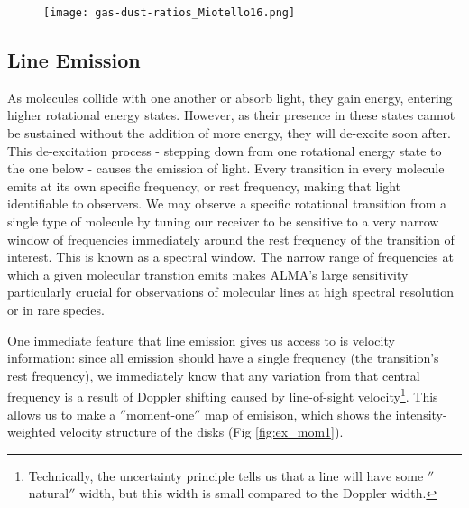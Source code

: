 \begin{figure}
\centering
  \texttt{[image: gas-dust-ratios\_Miotello16.png]}
  \label{fig:gas-dust-ratios}
\end{figure}







\subsection{Line Emission}

As molecules collide with one another or absorb light, they gain energy, entering higher rotational energy states. However, as their presence in these states cannot be sustained without the addition of more energy, they will de-excite soon after. This de-excitation process - stepping down from one rotational energy state to the one below - causes the emission of light. Every transition in every molecule emits at its own specific frequency, or rest frequency, making that light identifiable to observers. We may observe a specific rotational transition from a single type of molecule by tuning our receiver to be sensitive to a very narrow window of frequencies immediately around the rest frequency of the transition of interest. This is known as a spectral window. The narrow range of frequencies at which a given molecular transtion emits makes ALMA's large sensitivity particularly crucial for observations of molecular lines at high spectral resolution or in rare species.

One immediate feature that line emission gives us access to is velocity information: since all emission should have a single frequency (the transition's rest frequency), we immediately know that any variation from that central frequency is a result of Doppler shifting caused by line-of-sight velocity\footnote{Technically, the uncertainty principle tells us that a line will have some $''$natural$''$ width, but this width is small compared to the Doppler width.}. This allows us to make a $''$moment-one$''$ map of emisison, which shows the intensity-weighted velocity structure of the disks (Fig \ref{fig:ex_mom1}).


